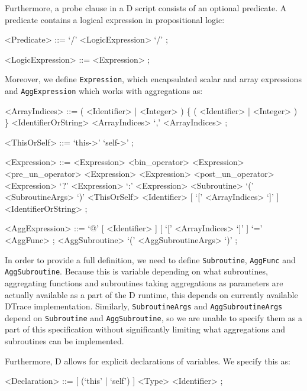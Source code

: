 \noindent
Furthermore, a probe clause in a D script consists of an optional predicate. A
predicate contains a logical expression in propositional logic:

\begin{grammar}
<Predicate> ::= `/' <LogicExpression> `/' ;

<LogicExpression> ::= <Expression> ;
\end{grammar}

\noindent
Moreover, we define \texttt{Expression}, which encapsulated scalar and array
expressions and \texttt{AggExpression} which works with aggregations as:
\begin{grammar}
<ArrayIndices> ::= ( <Identifier> | <Integer> ) \{ ( <Identifier> | <Integer> ) \}
               \alt <IdentifierOrString>
               \alt <ArrayIndices> `,' <ArrayIndices> ;

<ThisOrSelf> ::= `this->'
             \alt `self->' ;

<Expression> ::=  <Expression> <bin\_operator> <Expression>
             \alt <pre\_un\_operator> <Expression>
             \alt <Expression> <post\_un\_operator>
             \alt <Expression> `?' <Expression> `:' <Expression>
             \alt <Subroutine> `(' <SubroutineArgs> `)'
             \alt <ThisOrSelf> <Identifier> [ `[' <ArrayIndices> `]' ]
             \alt <IdentifierOrString> ;

<AggExpression> ::=  `@' [ <Identifier> ] [ `[' <ArrayIndices> `]' ] `=' <AggFunc> ;
                \alt <AggSubroutine> `(' <AggSubroutineArgs> `)' ;
\end{grammar}

\noindent
In order to provide a full definition, we need to define \texttt{Subroutine},
\texttt{AggFunc} and \texttt{AggSubroutine}. Because this is variable depending on
what subroutines, aggregating functions and subroutines taking aggregations as parameters
are actually available as a part of the D runtime, this depends on currently available
DTrace implementation. Similarly, \texttt{SubroutineArgs} and \texttt{AggSubroutineArgs}
depend on \texttt{Subroutine} and \texttt{AggSubroutine}, so we are unable to specify them
as a part of this specification without significantly limiting what aggregations and subroutines
can be implemented. \newline

\noindent
Furthermore, D allows for explicit declarations of variables. We specify this as:
\begin{grammar}
<Declaration> ::= [ (`this' | `self') ] <Type> <Identifier> ;
\end{grammar}

